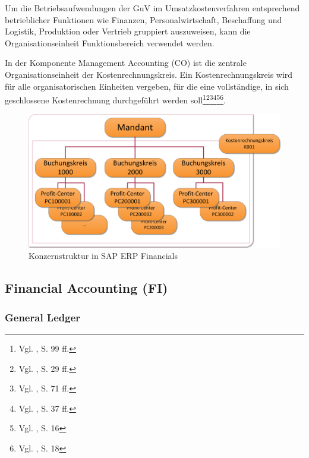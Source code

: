 Um die Betriebsaufwendungen der GuV im Umsatzkostenverfahren entsprechend betrieblicher Funktionen wie Finanzen, Personalwirtschaft, Beschaffung und Logistik, Produktion oder Vertrieb gruppiert auszuweisen, kann die Organisationseinheit Funktionsbereich verwendet werden.

In der Komponente Management Accounting (CO) ist die zentrale Organisationseinheit der Kostenrechnungskreis. Ein Kostenrechnungskreis wird für alle organisatorischen Einheiten vergeben, für die eine vollständige, in sich geschlossene Kostenrechnung durchgeführt werden soll\footnote{Vgl. \cite{Hefner2001}, S. 99 ff.}\footnote{Vgl. \cite{Friedl2008}, S. 29 ff.}\footnote{Vgl. \cite{Maassen2006}, S. 71 ff.}\footnote{Vgl. \cite{Patel2009}, S. 37 ff.}\footnote{Vgl. \cite{Padhi2011}, S. 16}\footnote{Vgl. \cite{SAPFI2001}, S. 18}.

\begin{figure}[htbp]
\includegraphics[width=1\textwidth]{Images/konzernStruktur.png}
\begin{center}
   \caption[Konzernstruktur in SAP ERP Financials]{Konzernstruktur in SAP ERP Financials}\label{abb2}
\end{center}
\end{figure}\noindent





\subsection{Financial Accounting (FI)} %
\subsubsection{General Ledger} %
